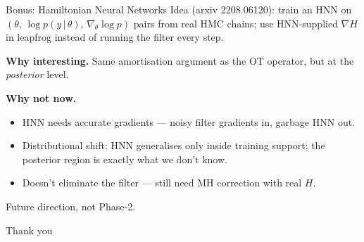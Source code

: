 \documentclass[10pt,aspectratio=169]{beamer}
\newcommand{\given}{\,|\,}
\begin{document}
\begin{frame}{Bonus: Hamiltonian Neural Networks}
  Idea (arxiv 2208.06120): train an HNN on $(\theta,\, \log p(y\given\theta),\, \nabla_\theta \log p)$ pairs from real HMC chains; use HNN-supplied $\nabla H$ in leapfrog instead of running the filter every step.

  \medskip
  \textbf{Why interesting.} Same amortisation argument as the OT operator, but at the \emph{posterior} level.

  \medskip
  \textbf{Why not now.}
  \begin{itemize}
    \item HNN needs accurate gradients --- noisy filter gradients in, garbage HNN out.
    \item Distributional shift: HNN generalises only inside training support; the posterior region is exactly what we don't know.
    \item Doesn't eliminate the filter --- still need MH correction with real $H$.
  \end{itemize}

  \medskip
  Future direction, not Phase-2.
\end{frame}

\begin{frame}[standout]
  Thank you
\end{frame}
\end{document}

